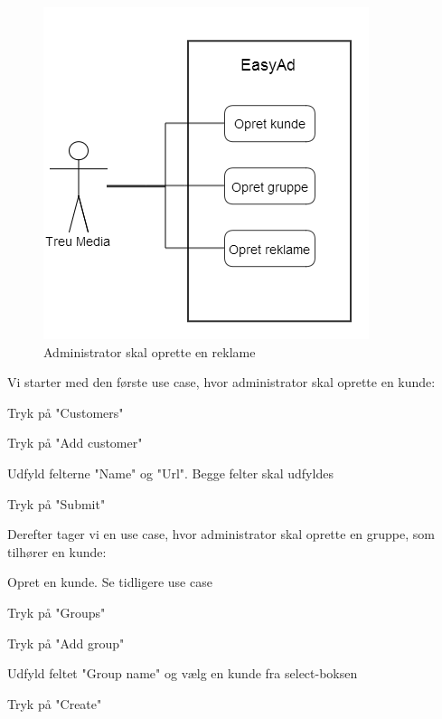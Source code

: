 \documentclass[a4paper,12pt]{article}
\begin{document}
\begin{figure}[h!]
  \centering
    \includegraphics[scale=0.5]{three_use_cases.png}
  \caption{Administrator skal oprette en reklame}
\end{figure}

Vi starter med den første use case, hvor administrator skal oprette en kunde:
\begin{usecase}
 {
	\item Tryk på "Customers"
	\item Tryk på "Add customer"
	\item Udfyld felterne "Name" og "Url". Begge felter skal udfyldes
	\item Tryk på "Submit"
}
\end{usecase}

Derefter tager vi en use case, hvor administrator skal oprette en gruppe, som tilhører en kunde:
\begin{usecase}
 {
	\item Opret en kunde. Se tidligere use case
	\item Tryk på "Groups"
	\item Tryk på "Add group"
	\item Udfyld feltet "Group name" og vælg en kunde fra select-boksen
	\item Tryk på "Create"
}
\end{usecase}
\end{document}

